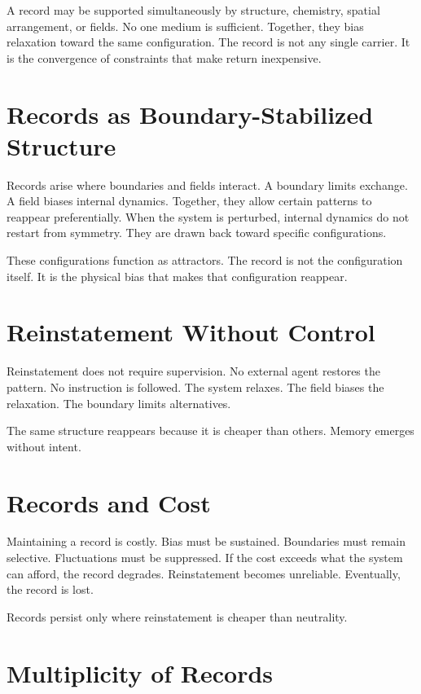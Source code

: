 \documentclass[11pt,twoside,openright]{book}
\begin{document}
A record may be supported simultaneously by structure, chemistry, spatial arrangement, or fields. No one medium is sufficient. Together, they bias relaxation toward the same configuration. The record is not any single carrier. It is the convergence of constraints that make return inexpensive.

\section*{Records as Boundary-Stabilized Structure}

Records arise where boundaries and fields interact. A boundary limits exchange. A field biases internal dynamics. Together, they allow certain patterns to reappear preferentially. When the system is perturbed, internal dynamics do not restart from symmetry. They are drawn back toward specific configurations.

These configurations function as attractors. The record is not the configuration itself. It is the physical bias that makes that configuration reappear.

\section*{Reinstatement Without Control}

Reinstatement does not require supervision. No external agent restores the pattern. No instruction is followed. The system relaxes. The field biases the relaxation. The boundary limits alternatives.

The same structure reappears because it is cheaper than others. Memory emerges without intent.

\section*{Records and Cost}

Maintaining a record is costly. Bias must be sustained. Boundaries must remain selective. Fluctuations must be suppressed. If the cost exceeds what the system can afford, the record degrades. Reinstatement becomes unreliable. Eventually, the record is lost.

Records persist only where reinstatement is cheaper than neutrality.

\section*{Multiplicity of Records}
\end{document}
